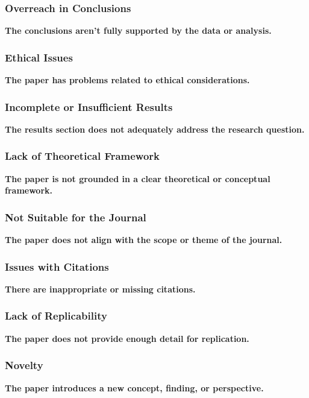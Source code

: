 \documentclass[handout]{beamer}
\begin{document}
\begin{frame}[plain]
\centering
\frametitle{Overreach in Conclusions}
\begin{framed}
\Large\textbf{The conclusions aren't fully supported by the data or analysis.}
\end{framed}
\end{frame}
\begin{frame}[plain]
\centering
\frametitle{Ethical Issues}
\begin{framed}
\Large\textbf{The paper has problems related to ethical considerations.}
\end{framed}
\end{frame}
\begin{frame}[plain]
\centering
\frametitle{Incomplete or Insufficient Results}
\begin{framed}
\Large\textbf{The results section does not adequately address the research question.}
\end{framed}
\end{frame}
\begin{frame}[plain]
\centering
\frametitle{Lack of Theoretical Framework}
\begin{framed}
\Large\textbf{The paper is not grounded in a clear theoretical or conceptual framework.}
\end{framed}
\end{frame}
\begin{frame}[plain]
\centering
\frametitle{Not Suitable for the Journal}
\begin{framed}
\Large\textbf{The paper does not align with the scope or theme of the journal.}
\end{framed}
\end{frame}
\begin{frame}[plain]
\centering
\frametitle{Issues with Citations}
\begin{framed}
\Large\textbf{There are inappropriate or missing citations.}
\end{framed}
\end{frame}
\begin{frame}[plain]
\centering
\frametitle{Lack of Replicability}
\begin{framed}
\Large\textbf{The paper does not provide enough detail for replication.}
\end{framed}
\end{frame}
\begin{frame}[plain]
\centering
\frametitle{Novelty}
\begin{framed}
\Large\textbf{The paper introduces a new concept, finding, or perspective.}
\end{framed}
\end{frame}
\end{document}
